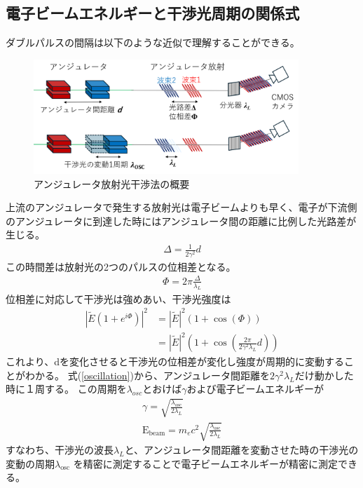 \documentclass[a4paper,11pt,uplatex]{jsbook}
\begin{document}
\subsection{電子ビームエネルギーと干渉光周期の関係式}
ダブルパルスの間隔は以下のような近似で理解することができる。
\begin{figure}
  \centering
  \includegraphics[width=10cm]{image/2-lambdaosc.png}
  \caption{アンジュレータ放射光干渉法の概要}
\end{figure}
上流のアンジュレータで発生する放射光は電子ビームよりも早く、電子が下流側のアンジュレータに到達した時にはアンジュレータ間の距離に比例した光路差が生じる。
\begin{eqnarray}
  \Delta = \frac{1}{2\gamma^2}d \label{path shift}
\end{eqnarray}
この時間差は放射光の2つのパルスの位相差となる。
\begin{eqnarray}
  \Phi = 2\pi \frac{\Delta}{\lambda_L}
\end{eqnarray}
位相差に対応して干渉光は強めあい、干渉光強度は
\begin{eqnarray}
  |\tilde{E} \left( 1+ e^{i\Phi}\right)|^2 
&= |\tilde{E}|^2 \left( 1 + \cos(\Phi) \right)\\
&= |\tilde{E}|^2 \left( 1 + \cos(\frac{2\pi}{2\gamma^2\lambda_L}d) \right) 
  \label{oscillation}
\end{eqnarray}
これより、dを変化させると干渉光の位相差が変化し強度が周期的に変動することがわかる。
式(\ref{oscillation})から、アンジュレータ間距離を$2\gamma^2\lambda_L$だけ動かした時に１周する。
この周期を$\lambda_{osc}$とおけば$\gamma$および電子ビームエネルギーが
\begin{eqnarray}
  \gamma = \sqrt{\frac{\lambda_{\text{osc}}}{2\lambda_L}}\\
  \text{E}_\text{beam} =m_e c^2  \sqrt{\frac{\lambda_{\text{osc}}}{2\lambda_L}} \label{zero order energy formula}
\end{eqnarray}
すなわち、干渉光の波長$\lambda_L$と、アンジュレータ間距離を変動させた時の干渉光の変動の周期$\lambda_{\text{osc}}$
を精密に測定することで電子ビームエネルギーが精密に測定できる。
\end{document}
